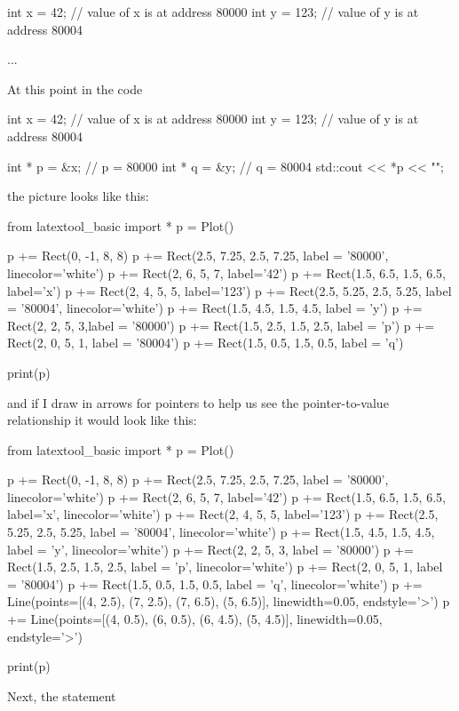 \begin{consolethree}[escapeinside=||]
int x = 42;         // value of x is at address 80000
int y = 123;        // value of y is at address 80004

...
\end{consolethree}
At this point in the code
\begin{consolethree}[escapeinside=||]
int x = 42;         // value of x is at address 80000
int y = 123;        // value of y is at address 80004

int * p = &x;       // p = 80000
int * q = &y;       // q = 80004
std::cout << *p << "\n";
\end{consolethree}
the picture looks like this:
\begin{python}
from latextool_basic import *
p = Plot()

p += Rect(0, -1, 8, 8)
p += Rect(2.5, 7.25, 2.5, 7.25, label = '80000', linecolor='white')
p += Rect(2, 6, 5, 7, label='42')
p += Rect(1.5, 6.5, 1.5, 6.5, label='x')
p += Rect(2, 4, 5, 5, label='123')
p += Rect(2.5, 5.25, 2.5, 5.25, label = '80004', linecolor='white')
p += Rect(1.5, 4.5, 1.5, 4.5, label = 'y')
p += Rect(2, 2, 5, 3,label = '80000')
p += Rect(1.5, 2.5, 1.5, 2.5, label = 'p')
p += Rect(2, 0, 5, 1, label = '80004')
p += Rect(1.5, 0.5, 1.5, 0.5, label = 'q')

print(p)
\end{python}

and if I draw in arrows for pointers to help us see the pointer-to-value
relationship it would look like this:
\begin{python}
from latextool_basic import *
p = Plot()

p += Rect(0, -1, 8, 8)
p += Rect(2.5, 7.25, 2.5, 7.25, label = '80000', linecolor='white')
p += Rect(2, 6, 5, 7, label='42')
p += Rect(1.5, 6.5, 1.5, 6.5, label='x', linecolor='white')
p += Rect(2, 4, 5, 5, label='123')
p += Rect(2.5, 5.25, 2.5, 5.25, label = '80004', linecolor='white')
p += Rect(1.5, 4.5, 1.5, 4.5, label = 'y', linecolor='white')
p += Rect(2, 2, 5, 3, label = '80000')
p += Rect(1.5, 2.5, 1.5, 2.5, label = 'p', linecolor='white')
p += Rect(2, 0, 5, 1, label = '80004')
p += Rect(1.5, 0.5, 1.5, 0.5, label = 'q', linecolor='white')
p += Line(points=[(4, 2.5), (7, 2.5), (7, 6.5), (5, 6.5)], linewidth=0.05, endstyle='>')
p += Line(points=[(4, 0.5), (6, 0.5), (6, 4.5), (5, 4.5)], linewidth=0.05, endstyle='>')

print(p)
\end{python}
Next, the statement

